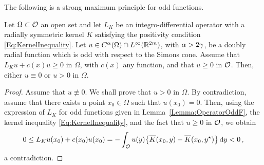 The following is a strong maximum principle for odd functions.

\begin{proposition}
\label{Prop:StrongMaximumPrincipleForOddFunctions} Let $\Omega \subset \mathcal{O}$ an open set and let $L_K$ be an integro-differential operator with a radially symmetric kernel $K$ satisfying the positivity condition \eqref{Eq:KernelInequality}.  Let $u\in C^{\alpha}(\Omega)\cap L^\infty(\mathbb{R}^{2m})$, with $\alpha > 2\gamma$, be a doubly radial function which is odd with respect to the Simons cone. Assume that $L_K u + c(x) u\geq 0$ in $\Omega$, with $c(x)$ any function, and that $u\geq 0$ in $\mathcal{O}$. Then, either $u\equiv 0$ or $u > 0$ in $\Omega$.
\end{proposition}

\begin{proof}
Assume that $u \not \equiv 0$. We shall prove that $u > 0$ in $\Omega$. By contradiction, assume that there exists a point $x_0\in \Omega$ such that $u(x_0)= 0$. Then, using the expression of $L_K $ for odd functions given in Lemma~\ref{Lemma:OperatorOddF}, the kernel inequality \eqref{Eq:KernelInequality}, and the fact that $u\geq 0$ in $\mathcal{O}$, we obtain
$$
0 \leq L_K u(x_0) + c(x_0) u(x_0) = - \int_{\mathcal{O}} u(y)\big \{\overline{K}(x_0, y) - \overline{K}(x_0, y^\star) \big \}\,\mathrm{d} y < 0\,,
$$
a contradiction.
\end{proof}


